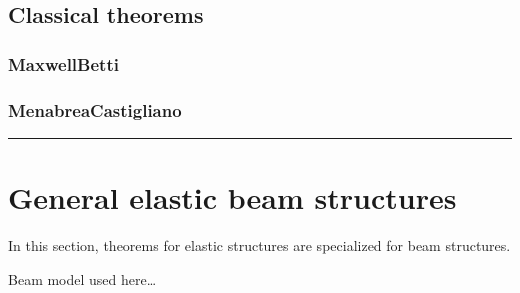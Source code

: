 \documentclass[letterpaper,10pt,english]{jupyterBook}
\begin{document}
\subsection{Classical theorems}
\label{\detokenize{ch/solids/small-displacements-statics-weak-form-3d:classical-theorems}}
\sphinxAtStartPar
{}


\subsubsection{Maxwell\sphinxhyphen{}Betti}
\label{\detokenize{ch/solids/small-displacements-statics-weak-form-3d:maxwell-betti}}



\subsubsection{Menabrea\sphinxhyphen{}Castigliano}
\label{\detokenize{ch/solids/small-displacements-statics-weak-form-3d:menabrea-castigliano}}

\bigskip\hrule\bigskip


\sphinxstepscope


\section{General elastic beam structures}
\label{\detokenize{ch/solids/small-displacements-statics-beams-weak-form-general:general-elastic-beam-structures}}\label{\detokenize{ch/solids/small-displacements-statics-beams-weak-form-general:solid-mechanics-intro-small-displacements-statics-beam-weak-form-general}}\label{\detokenize{ch/solids/small-displacements-statics-beams-weak-form-general::doc}}
\sphinxAtStartPar
In this section, theorems for elastic structures are specialized for beam structures.

\sphinxAtStartPar
{} Beam model used here…
\end{document}
